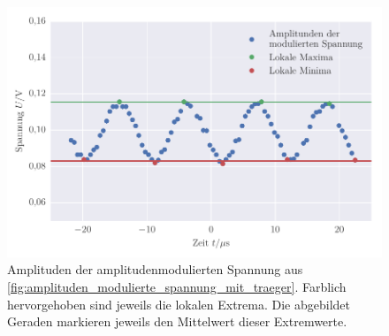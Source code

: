 
\FloatBarrier\begin{figure}[!h]
\centering
\includegraphics[scale=1]{../Grafiken/Amplituden_Modulierte_Spannung_mit_Traeger_Modulationsgrad.pdf}
\caption{Amplituden der amplitudenmodulierten Spannung aus \cref{fig:amplituden_modulierte_spannung_mit_traeger}.
Farblich hervorgehoben sind jeweils die lokalen Extrema. Die abgebildet Geraden markieren jeweils den Mittelwert
dieser Extremwerte.
 \label{fig:amplituden_modulierte_spannung_mit_traeger_modulationsgrad}}
\end{figure}
\FloatBarrier
